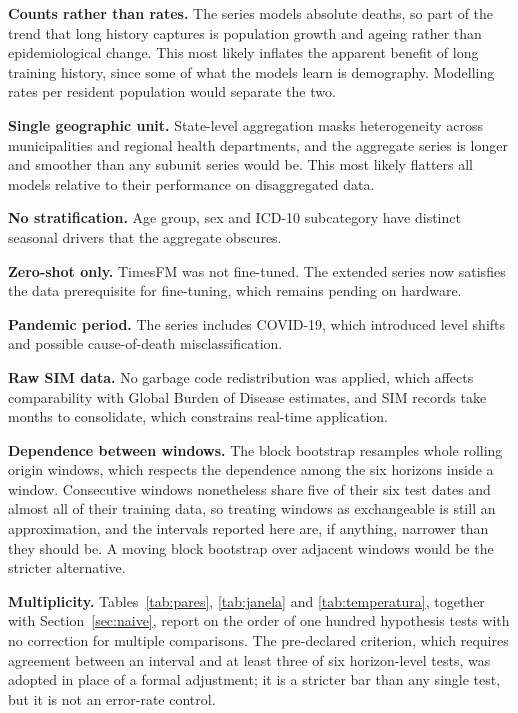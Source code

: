 \textbf{Counts rather than rates.} The series models absolute deaths, so part of the trend
that long history captures is population growth and ageing rather than epidemiological
change. This most likely inflates the apparent benefit of long training history, since some
of what the models learn is demography. Modelling rates per resident population would
separate the two.

\textbf{Single geographic unit.} State-level aggregation masks heterogeneity across
municipalities and regional health departments, and the aggregate series is longer and
smoother than any subunit series would be. This most likely flatters all models relative to
their performance on disaggregated data.

\textbf{No stratification.} Age group, sex and ICD-10 subcategory have distinct seasonal
drivers that the aggregate obscures.

\textbf{Zero-shot only.} TimesFM was not fine-tuned. The extended series now satisfies the
data prerequisite for fine-tuning, which remains pending on hardware.

\textbf{Pandemic period.} The series includes COVID-19, which introduced level shifts and
possible cause-of-death misclassification.

\textbf{Raw SIM data.} No garbage code redistribution was applied, which affects
comparability with Global Burden of Disease estimates, and SIM records take months to
consolidate, which constrains real-time application.

\textbf{Dependence between windows.} The block bootstrap resamples whole rolling origin
windows, which respects the dependence among the six horizons inside a window. Consecutive
windows nonetheless share five of their six test dates and almost all of their training
data, so treating windows as exchangeable is still an approximation, and the intervals
reported here are, if anything, narrower than they should be. A moving block bootstrap over
adjacent windows would be the stricter alternative.

\textbf{Multiplicity.} Tables~\ref{tab:pares}, \ref{tab:janela} and
\ref{tab:temperatura}, together with Section~\ref{sec:naive}, report on the order of one
hundred hypothesis tests with no correction for multiple comparisons. The pre-declared
criterion, which requires agreement between an interval and at least three of six
horizon-level tests, was adopted in place of a formal adjustment; it is a stricter bar than
any single test, but it is not an error-rate control.

